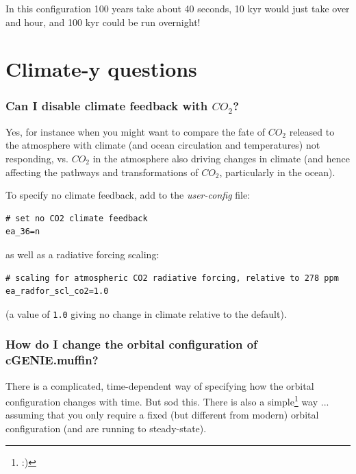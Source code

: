 \documentclass[11pt,fleqn]{book} %
\begin{document}
In this configuration 100 years take about 40 seconds, 10 kyr would just take over and hour, and 100 kyr could be run overnight!


\newpage


\section{Climate-y questions}

%
\subsubsection{Can I disable climate feedback with \(CO_{2}\)?}

Yes, for instance when you might want to compare the fate of \(CO_{2}\) released to the atmosphere with climate (and ocean circulation and temperatures) not responding, vs. \(CO_{2}\) in the atmosphere also driving changes in climate (and hence affecting the pathways and transformations of \(CO_{2}\), particularly in the ocean).

\vspace{2mm}
To specify no climate feedback, add to the \textit{user-config} file:
\vspace{-2mm}\small\begin{verbatim}
# set no CO2 climate feedback
ea_36=n
\end{verbatim}\normalsize\vspace{-2mm}
as well as a radiative forcing scaling:
\vspace{-2mm}\small\begin{verbatim}
# scaling for atmospheric CO2 radiative forcing, relative to 278 ppm
ea_radfor_scl_co2=1.0
\end{verbatim}\normalsize\vspace{-2mm}
(a value of \texttt{1.0} giving no change in climate relative to the default).

%
\subsubsection{How do I change the orbital configuration of cGENIE.muffin?}

There is a complicated, time-dependent way of specifying how the orbital configuration changes with time. But sod this. There is also a simple\footnote{:)} way ... assuming that you only require a fixed (but different from modern) orbital configuration (and are running to steady-state).
\end{document}
